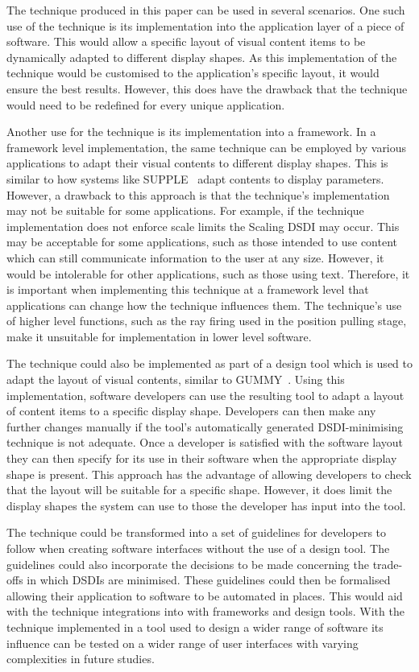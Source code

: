 \documentclass[review,5p,times,twocolumn]{elsarticle}
\begin{document}
The technique produced in this paper can be used in several scenarios.
One such use of the technique is its implementation into the application layer of a piece of software.
This would allow a specific layout of visual content items to be dynamically adapted to different display shapes.
As this implementation of the technique would be customised to the application's specific layout, it would ensure the best results.
However, this does have the drawback that the technique would need to be redefined for every unique application.

Another use for the technique is its implementation into a framework.
In a framework level implementation, the same technique can be employed by various applications to adapt their visual contents to different display shapes.
This is similar to how systems like SUPPLE~\cite{Gajos2004} adapt contents to display parameters.
However, a drawback to this approach is that the technique's implementation may not be suitable for some applications.  
For example, if the technique implementation does not enforce scale limits the Scaling \ac{DSDI} may occur.
This may be acceptable for some applications, such as those intended to use content which can still communicate information to the user at any size.
However, it would be intolerable for other applications, such as those using text.
Therefore, it is important when implementing this technique at a framework level that applications can change how the technique influences them.
The technique's use of higher level functions, such as the ray firing used in the position pulling stage, make it unsuitable for implementation in lower level software.

The technique could also be implemented as part of a design tool which is used to adapt the layout of visual contents, similar to GUMMY~\cite{Meskens2008}.
Using this implementation, software developers can use the resulting tool to adapt a layout of content items to a specific display shape.
Developers can then make any further changes manually if the tool's automatically generated \ac{DSDI}-minimising technique is not adequate.
Once a developer is satisfied with the software layout they can then specify for its use in their software when the appropriate display shape is present.
This approach has the advantage of allowing developers to check that the layout will be suitable for a specific shape.
However, it does limit the display shapes the system can use to those the developer has input into the tool.

The technique could be transformed into a set of guidelines for developers to follow when creating software interfaces without the use of a design tool.
The guidelines could also incorporate the decisions to be made concerning the trade-offs in which \acp{DSDI} are minimised.
These guidelines could then be formalised~\cite{Ngo2000} allowing their application to software to be automated in places.
This would aid with the technique integrations into with frameworks and design tools.
With the technique implemented in a tool used to design a wider range of software its influence can be tested on a wider range of user interfaces with varying complexities in future studies.
\end{document}
